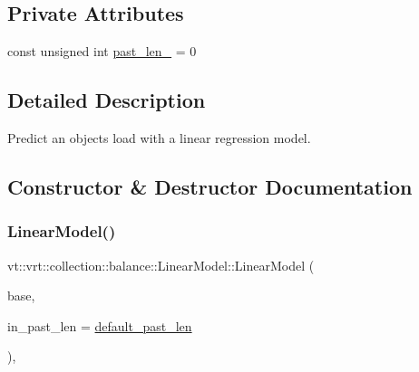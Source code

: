 \subsection*{Private Attributes}
\begin{DoxyCompactItemize}
\item 
const unsigned int \hyperlink{structvt_1_1vrt_1_1collection_1_1balance_1_1_linear_model_ab8225e994dfda4bfc16371cbf58ef578}{past\+\_\+len\+\_\+} = 0
\end{DoxyCompactItemize}


\subsection{Detailed Description}
Predict an object\textquotesingle{}s load with a linear regression model. 

\subsection{Constructor \& Destructor Documentation}
\mbox{\label{structvt_1_1vrt_1_1collection_1_1balance_1_1_linear_model_a90fff488014731417431b35295a263d7}} 
\subsubsection{\texorpdfstring{Linear\+Model()}{LinearModel()}}
{\footnotesize\ttfamily vt\+::vrt\+::collection\+::balance\+::\+Linear\+Model\+::\+Linear\+Model (\begin{DoxyParamCaption}\item[{std\+::shared\+\_\+ptr$<$ \hyperlink{structvt_1_1vrt_1_1collection_1_1balance_1_1_load_model}{balance\+::\+Load\+Model} $>$}]{base,  }\item[{unsigned int}]{in\+\_\+past\+\_\+len = {\ttfamily \hyperlink{structvt_1_1vrt_1_1collection_1_1balance_1_1_linear_model_a5735a20dfd17fb2804a1b9b90d5649d1}{default\+\_\+past\+\_\+len}} }\end{DoxyParamCaption})\hspace{0.3cm}{\ttfamily [inline]}, {\ttfamily [explicit]}}




